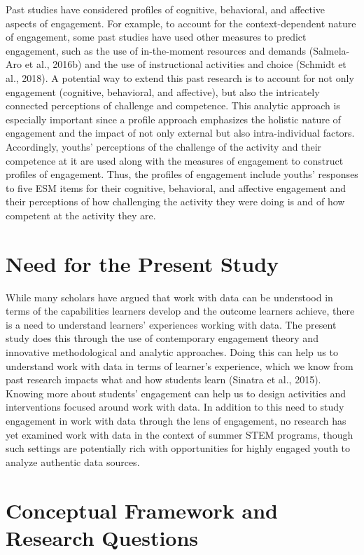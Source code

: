 \documentclass[]{book}
\theoremstyle{definition}
\theoremstyle{definition}
\theoremstyle{definition}
\theoremstyle{remark}
\begin{document}
Past studies have considered profiles of cognitive, behavioral, and
affective aspects of engagement. For example, to account for the
context-dependent nature of engagement, some past studies have used
other measures to predict engagement, such as the use of in-the-moment
resources and demands (Salmela-Aro et al., 2016b) and the use of
instructional activities and choice (Schmidt et al., 2018). A potential
way to extend this past research is to account for not only engagement
(cognitive, behavioral, and affective), but also the intricately
connected perceptions of challenge and competence. This analytic
approach is especially important since a profile approach emphasizes the
holistic nature of engagement and the impact of not only external but
also intra-individual factors. Accordingly, youths' perceptions of the
challenge of the activity and their competence at it are used along with
the measures of engagement to construct profiles of engagement. Thus,
the profiles of engagement include youths' responses to five ESM items
for their cognitive, behavioral, and affective engagement and their
perceptions of how challenging the activity they were doing is and of
how competent at the activity they are.

\section{Need for the Present Study}\label{need-for-the-present-study}

While many scholars have argued that work with data can be understood in
terms of the capabilities learners develop and the outcome learners
achieve, there is a need to understand learners' experiences working
with data. The present study does this through the use of contemporary
engagement theory and innovative methodological and analytic approaches.
Doing this can help us to understand work with data in terms of
learner's experience, which we know from past research impacts what and
how students learn (Sinatra et al., 2015). Knowing more about students'
engagement can help us to design activities and interventions focused
around work with data. In addition to this need to study engagement in
work with data through the lens of engagement, no research has yet
examined work with data in the context of summer STEM programs, though
such settings are potentially rich with opportunities for highly engaged
youth to analyze authentic data sources.

\section{Conceptual Framework and Research
Questions}\label{conceptual-framework-and-research-questions}
\end{document}
